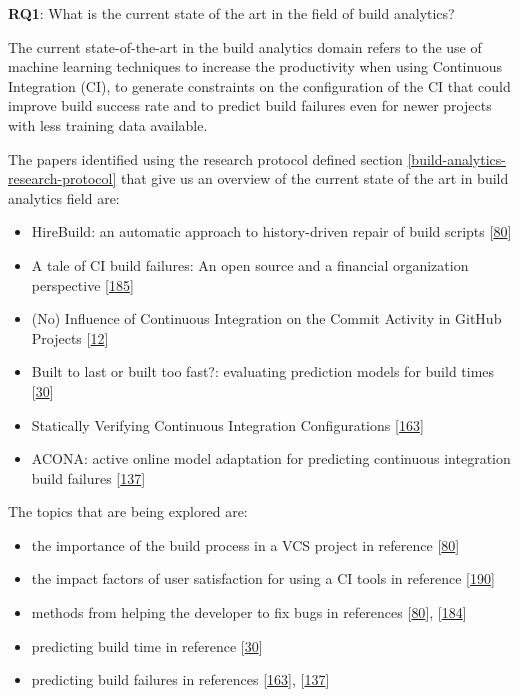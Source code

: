 \documentclass[]{book}
\providecommand{\tightlist}{%
  \setlength{\itemsep}{0pt}\setlength{\parskip}{0pt}}
\begin{document}
\textbf{RQ1}: What is the current state of the art in the field of build
analytics?

The current state-of-the-art in the build analytics domain refers to the
use of machine learning techniques to increase the productivity when
using Continuous Integration (CI), to generate constraints on the
configuration of the CI that could improve build success rate and to
predict build failures even for newer projects with less training data
available.

The papers identified using the research protocol defined section
\ref{build-analytics-research-protocol} that give us an overview of the
current state of the art in build analytics field are:

\begin{itemize}
\tightlist
\item
  HireBuild: an automatic approach to history-driven repair of build
  scripts {[}\protect\hyperlink{ref-hassan2018hirebuild}{80}{]}
\item
  A tale of CI build failures: An open source and a financial
  organization perspective
  {[}\protect\hyperlink{ref-vassallo2017tale}{185}{]}
\item
  (No) Influence of Continuous Integration on the Commit Activity in
  GitHub Projects {[}\protect\hyperlink{ref-baltes2018no}{12}{]}
\item
  Built to last or built too fast?: evaluating prediction models for
  build times {[}\protect\hyperlink{ref-bisong2017built}{30}{]}
\item
  Statically Verifying Continuous Integration Configurations
  {[}\protect\hyperlink{ref-santolucito2018statically}{163}{]}
\item
  ACONA: active online model adaptation for predicting continuous
  integration build failures
  {[}\protect\hyperlink{ref-ni2018acona}{137}{]}
\end{itemize}

The topics that are being explored are:

\begin{itemize}
\tightlist
\item
  the importance of the build process in a VCS project in reference
  {[}\protect\hyperlink{ref-hassan2018hirebuild}{80}{]}
\item
  the impact factors of user satisfaction for using a CI tools in
  reference {[}\protect\hyperlink{ref-widder2018m}{190}{]}
\item
  methods from helping the developer to fix bugs in references
  {[}\protect\hyperlink{ref-hassan2018hirebuild}{80}{]},
  {[}\protect\hyperlink{ref-vassallo2018break}{184}{]}
\item
  predicting build time in reference
  {[}\protect\hyperlink{ref-bisong2017built}{30}{]}
\item
  predicting build failures in references
  {[}\protect\hyperlink{ref-santolucito2018statically}{163}{]},
  {[}\protect\hyperlink{ref-ni2018acona}{137}{]}
\end{itemize}
\end{document}
